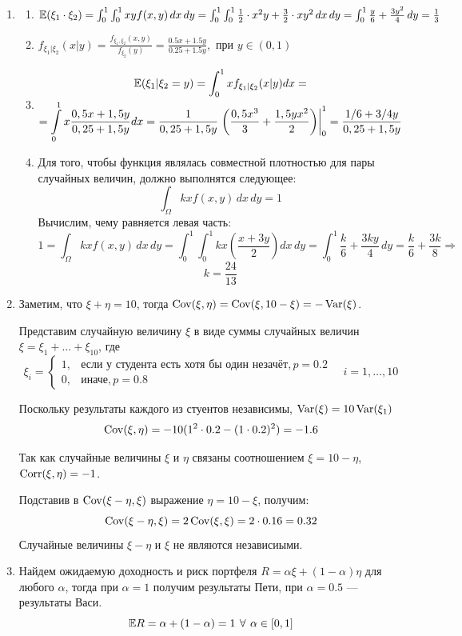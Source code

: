 \documentclass[12pt, a4paper]{article}\usepackage[]{graphicx}\usepackage[]{color}
\begin{document}
\begin{enumerate}
\item
\begin{enumerate}
\item $ \mathbb{E}({\xi_1 \cdot \xi_2}) = \int_{0}^1 \int_0^1 xy f(x,y) \, dx \, dy = \int_0^1 \int_0^1 \frac{1}{2}\cdot x^2y + \frac{3}{2}\cdot xy^2 \, dx \, dy = \int_{0}^1 \frac{y}{6} + \frac{3y^2}{4} \,dy = \frac{1}{3}$
\item $f_{\xi_1 | \xi_2} (x | y) = \frac{f_{\xi_1, \xi_2}(x, y)}{f_{\xi_2}(y)} = \frac{0.5x + 1.5y}{0.25 + 1.5y}, \text{ при } y \in (0,1)$
\item
\begin{multline*}
\mathbb{E}(\xi_1 | \xi_2 = y) = \int_0^1 x f_{\xi_1 | \xi_2} (x | y) dx = \\
= \int\limits_{0}^{1}  x \frac{0,5x + 1,5y}{0,25 + 1,5y} dx = \frac{1}{0,25 + 1,5y}  \left. \left( \dfrac{0,5x^3}{3} +  \dfrac{1,5yx^2}{2} \right) \right|_0^1  =  \frac{1/6 + 3/4y}{0,25 + 1,5y}
\end{multline*}
\item
Для того, чтобы функция являлась совместной плотностью для пары случайных величин, должно выполнятся следующее:
\[
\int_{\Omega} kx f(x,y) \, dx \, dy = 1
\]
Вычислим, чему равняется левая часть:
\[
1 = \int_{\Omega} kx f(x,y) \, dx \, dy = \int_{0}^1 \int_{0}^1 kx \left(\frac{x + 3y}{2}\right) dx \, dy = \int_{0}^1 \frac{k}{6} + \frac{3ky}{4} \, dy = \frac{k}{6} + \frac{3k}{8} \Rightarrow
\]
\[
k = \frac{24}{13}
\]
\end{enumerate}
\item Заметим, что $\xi + \eta = 10$, тогда $\operatorname{Cov}(\xi, \eta) = \operatorname{Cov}(\xi, 10-\xi) = -\operatorname{Var}(\xi)$.

Представим случайную величину $\xi$ в виде суммы случайных величин $\xi = \xi_1 + \ldots + \xi_{10}$, где
\[
\xi_i = \begin{cases}
1, & \text{если у студента есть хотя бы один незачёт}, p=0.2 \\
0, & \text{иначе}, p=0.8
\end{cases} \quad i = 1, \ldots, 10
\]

Поскольку результаты каждого из стуентов независимы, $\operatorname{Var}(\xi) = 10\operatorname{Var}(\xi_1)$
\[
\operatorname{Cov}(\xi, \eta) = -10(1^2 \cdot 0.2 - (1\cdot 0.2)^2) = -1.6
\]

Так как случайные величины $\xi$ и $\eta$ связаны соотношением $\xi = 10 - \eta$, $\operatorname{Corr}(\xi, \eta)=-1$.

Подставив в $\operatorname{Cov}(\xi - \eta, \xi)$ выражение $\eta = 10 - \xi$, получим:
\[
\operatorname{Cov}(\xi - \eta, \xi) = 2 \operatorname{Cov}(\xi, \xi) = 2 \cdot 0.16 = 0.32
\]
Случайные величины $\xi - \eta$ и $\xi$ не являются независиыми.
\item Найдем ожидаемую доходность и риск портфеля $R = \alpha \xi + (1-\alpha) \eta$ для любого $\alpha$, тогда при $\alpha = 1$ получим результаты Пети, при $\alpha = 0.5$ — результаты Васи.
\[
\mathbb{E} R = \alpha + (1-\alpha) = 1 \: \, \forall \, \: \alpha \in [0,1]
\]


\end{enumerate}
\end{document}
